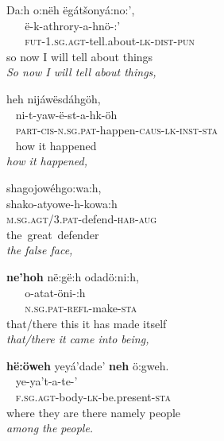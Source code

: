 \ea%
    \label{ex:6:8}
\ea
\gllll Da:h  o:nëh  ëgátšonyá:no:’,\\
      ~     ~      ë-k-athrory-a-hnö-:’\\
     ~      ~       \textsc{fut}{}-1.\textsc{sg}.\textsc{agt}{}-tell.about-\textsc{lk-dist-pun}\\
    so       now     {I will tell about things}\\

\textit{So now I will tell about things,}

\ex
\gllll heh     nijáwësdáhgöh,\\
      ~      ni-t-yaw-ë-st-a-hk-öh\\
      ~   \textsc{part-cis-n.sg.pat}{}-happen-\textsc{caus-lk-inst-sta}\\
      ~ {how it happened}\\

\textit{how it happened,}

\ex
\gllll shagojowéhgo:wa:h,\\
       shako-atyowe-h-kowa:h\\
       \textsc{m.sg.agt}/3.\textsc{pat}-defend-\textsc{hab-aug}\\
       the~great~defender\\

\textit{the false face,}

\ex
\gllll \textbf{ne’hoh}    në:gë:h  odadö:ni:h,\\
       ~               ~       o-atat-öni-:h\\
     ~                 ~        \textsc{n.sg.pat-refl}{}-make-\textsc{sta}\\
    that/there  this      {it has made itself}\\

\textit{that/there it came into being,}

\ex
\gllll \textbf{hë:öweh}   yeyá’dade’                       \textbf{neh}    ö:gweh.\\
          ~             ye-ya’t-a-te-’  ~ ~\\
          ~ \textsc{f.sg.agt}{}-body-\textsc{lk}{}-be.present-\textsc{sta} ~ ~ \\
  where        {they are there}                     namely  people\\

\textit{among the people.}
    \z
\z



